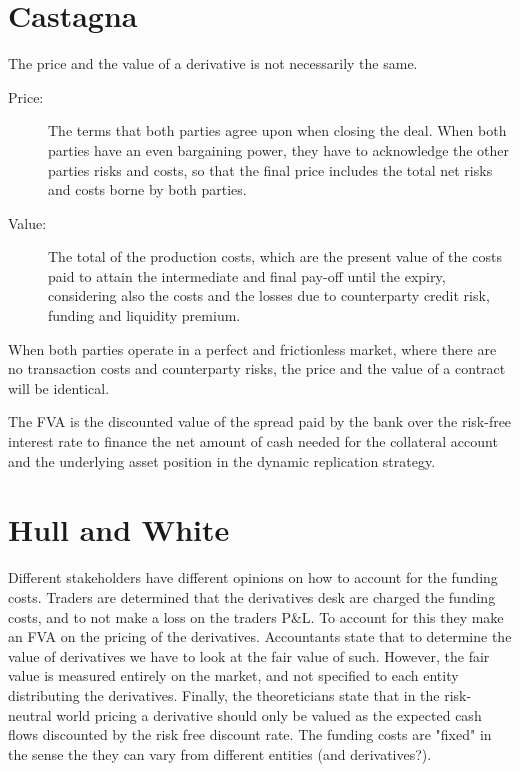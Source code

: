 \documentclass[10pt,a4paper]{article}
\begin{document}
     \section{Castagna}
        The price and the value of a derivative is not necessarily the same.

        \begin{description}
            \item[Price:] The terms that both parties agree upon when closing the deal. When both parties have an even bargaining power, they have to acknowledge the other parties risks and costs, so that the final price includes the total net risks and costs borne by both parties.
            \item[Value:] The total of the production costs, which are the present value of the costs paid to attain the intermediate and final pay-off until the expiry, considering also the costs and the losses due to counterparty credit risk, funding and liquidity premium.
        \end{description}

        When both parties operate in a perfect and frictionless market, where there are no transaction costs and counterparty risks, the price and the value of a contract will be identical.

        The FVA is the discounted value of the spread paid by the bank over the risk-free interest rate to finance the net amount of cash needed for the collateral account and the underlying asset position in the dynamic replication strategy.

    \section{Hull and White}
        Different stakeholders have different opinions on how to account for the funding costs. Traders are determined that the derivatives desk are charged the funding costs, and to not make a loss on the traders P\&L. To account for this they make an FVA on the pricing of the derivatives. Accountants state that to determine the value of derivatives we have to look at the fair value of such. However, the fair value is measured entirely on the market, and not specified to each entity distributing the derivatives. Finally, the theoreticians state that in the risk-neutral world pricing a derivative should only be valued as the expected cash flows discounted by the risk free discount rate. The funding costs are "fixed" in the sense the they can vary from different entities (and derivatives?).
\end{document}
